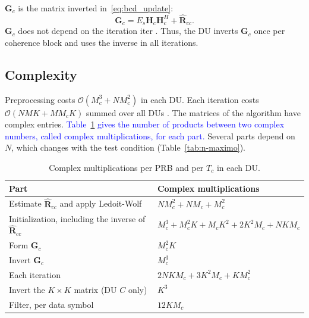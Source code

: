 $\mathbf G_c$ is the matrix inverted in~\eqref{eq:bcd_update}:
\begin{equation}\label{eq:Gc}
\mathbf G_c=
E_s\mathbf H_c\mathbf H_c^H+
\hat{\mathbf R}_{cc}.
\end{equation}
$\mathbf G_c$ does not depend on the iteration $\mathrm{iter}$ \cite{zhao2025jsac}. Thus, the DU inverts $\mathbf G_c$ once per coherence block and uses the inverse in all iterations.

\subsection{Complexity}\label{subsubsec:bcd-complexidade}

Preprocessing costs $\mathcal{O}(M_c^3 + N M_c^2)$ in each DU. Each iteration costs $\mathcal{O}(NMK + M M_c K)$ summed over all DUs \cite{zhao2025jsac}. The matrices of the algorithm have complex entries. \textcolor{blue}{Table~\ref{tab:bcd-complexidade} gives the number of products between two complex numbers, called complex multiplications, for each part.} Several parts depend on $N$, which changes with the test condition (Table~\ref{tab:n-maximo}).

\begin{table}[htbp]
\caption{Complex multiplications per PRB and per $T_c$ in each DU.}
\label{tab:bcd-complexidade}
\vspace{4pt}
\centering
\footnotesize
\renewcommand{\arraystretch}{1.2}
\setlength{\aboverulesep}{0pt}
\setlength{\belowrulesep}{0pt}
\begin{tabular}{|l|l|}
\toprule
\textbf{Part} & \textbf{Complex multiplications} \\
\midrule
Estimate $\hat{\mathbf R}_{cc}$ and apply Ledoit-Wolf & $N M_c^2 + N M_c + M_c^2$ \\
\hline
Initialization, including the inverse of $\hat{\mathbf R}_{cc}$ & $M_c^3 + M_c^2 K + M_c K^2 + 2K^2 M_c + N K M_c$ \\
\hline
Form $\mathbf G_c$ & $M_c^2 K$ \\
\hline
Invert $\mathbf G_c$ & $M_c^3$ \\
\hline
Each iteration & $2NKM_c + 3K^2 M_c + K M_c^2$ \\
\hline
Invert the $K \times K$ matrix (DU $C$ only) & $K^3$ \\
\hline
Filter, per data symbol & $12 K M_c$ \\
\bottomrule
\end{tabular}
\vspace{4pt}
\end{table}
